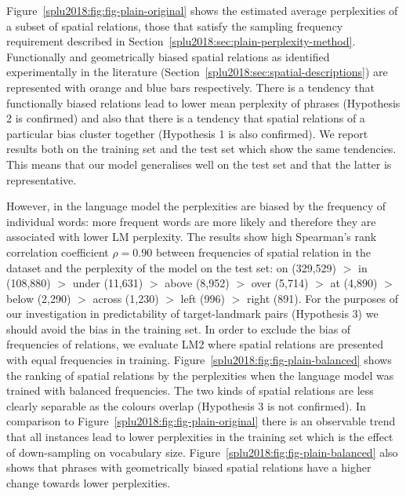 Figure~\ref{splu2018:fig:fig-plain-original} shows the estimated average
perplexities of a subset of spatial relations, those that satisfy the sampling frequency requirement described in Section~\ref{splu2018:sec:plain-perplexity-method}. Functionally and geometrically
biased spatial relations as identified experimentally in
the literature (Section~\ref{splu2018:sec:spatial-descriptions}) are
represented with orange and blue bars respectively. There is a tendency
that functionally biased relations lead to lower mean perplexity of
phrases (Hypothesis 2 is confirmed) and also that there is a tendency that spatial
relations of a particular bias cluster together (Hypothesis 1 is also confirmed). We report results both on the training set and the test set which show the same tendencies. This means that our model generalises well on the test set and that the latter is representative.











However, in the language model the perplexities are biased by the
frequency of individual words: more frequent words are more likely and
therefore they are
associated with lower LM perplexity. %
The results show high Spearman's rank correlation coefficient $\rho=0.90$ between frequencies of spatial relation in the dataset and the perplexity of the model on the test set:
on (329,529)
$>$ in (108,880)
$>$ under (11,631)
$>$ above (8,952)
$>$ over (5,714)
$>$ at (4,890)
$>$ below (2,290)
$>$ across	(1,230)
$>$ left (996)
$>$ right (891). For the purposes of our investigation in predictability of target-landmark pairs (Hypothesis 3) we should avoid the bias in the training set.
In order to exclude the
bias of frequencies of relations, we evaluate LM2 where spatial relations are presented with equal frequencies in training. %
Figure~\ref{splu2018:fig:fig-plain-balanced} shows the ranking of spatial
relations by the perplexities when the language model was trained with
balanced frequencies. The two kinds of spatial relations are less clearly separable as the colours overlap (Hypothesis 3 is not confirmed). In comparison to Figure~\ref{splu2018:fig:fig-plain-original} there is an observable trend that all instances
lead to lower perplexities in the training set which is the effect of down-sampling on vocabulary size. Figure~\ref{splu2018:fig:fig-plain-balanced} also shows that phrases with geometrically biased spatial relations have a higher change towards lower perplexities.


